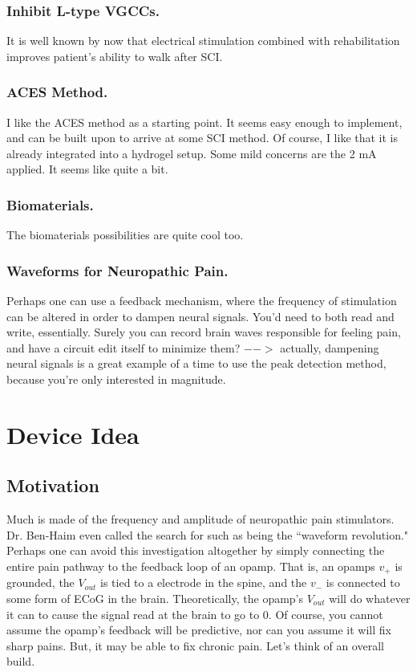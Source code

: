 \documentclass[12pt]{report}
\newcommand{\Vo}{{V}_{out}}
\begin{document}
\subsubsection{Inhibit L-type VGCCs.}
It is well known by now that electrical stimulation combined with rehabilitation improves patient's ability to walk after SCI. 

\subsubsection{ACES Method.}

I like the ACES method as a starting point. It seems easy enough to implement, and can be built upon to arrive at some SCI method. Of course, I like that it is already integrated into a hydrogel setup. Some mild concerns are the 2 mA applied. It seems like quite a bit. 

\subsubsection{Biomaterials.}

The biomaterials possibilities are quite cool too. 

\subsubsection{Waveforms for Neuropathic Pain.}
Perhaps one can use a feedback mechanism, where the frequency of stimulation can be altered in order to dampen neural signals. You'd need to both read and write, essentially. Surely you can record brain waves responsible for feeling pain, and have a circuit edit itself to minimize them? $-->$ actually, dampening neural signals is a great example of a time to use the peak detection method, because you're only interested in magnitude. 

\section{Device Idea}

\subsection{Motivation}
Much is made of the frequency and amplitude of neuropathic pain stimulators. Dr. Ben-Haim even called the search for such as being the ``waveform revolution." Perhaps one can avoid this investigation altogether by simply connecting the entire pain pathway to the feedback loop of an opamp. That is, an opamps $v_+$ is grounded, the $\Vo$ is tied to a electrode in the spine, and the $v_-$ is connected to some form of ECoG in the brain. Theoretically, the opamp's $\Vo$ will do whatever it can to cause the signal read at the brain to go to 0. Of course, you cannot assume the opamp's feedback will be predictive, nor can you assume it will fix sharp pains. But, it may be able to fix chronic pain. Let's think of an overall build. 
\end{document}

